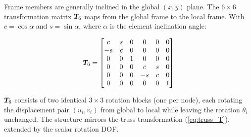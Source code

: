 Frame members are generally inclined in the global $(x,y)$ plane. The
$6\times6$ transformation matrix $\bm{T}_6$ maps from the global frame to
the local frame. With $c = \cos\alpha$ and $s = \sin\alpha$, where $\alpha$
is the element inclination angle:

\begin{equation}
    \bm{T}_6 =
    \begin{bmatrix}
         c &  s & 0 & 0 & 0 & 0 \\
        -s &  c & 0 & 0 & 0 & 0 \\
         0 &  0 & 1 & 0 & 0 & 0 \\
         0 &  0 & 0 & c & s & 0 \\
         0 &  0 & 0 &-s & c & 0 \\
         0 &  0 & 0 & 0 & 0 & 1
    \end{bmatrix}
    \label{eq:frame_T6}
\end{equation}

$\bm{T}_6$ consists of two identical $3\times3$ rotation blocks (one per
node), each rotating the displacement pair $(u_i,v_i)$ from global to local
while leaving the rotation $\theta_i$ unchanged.  The structure mirrors the
truss transformation (\cref{eq:truss_T}), extended by the scalar rotation DOF.

